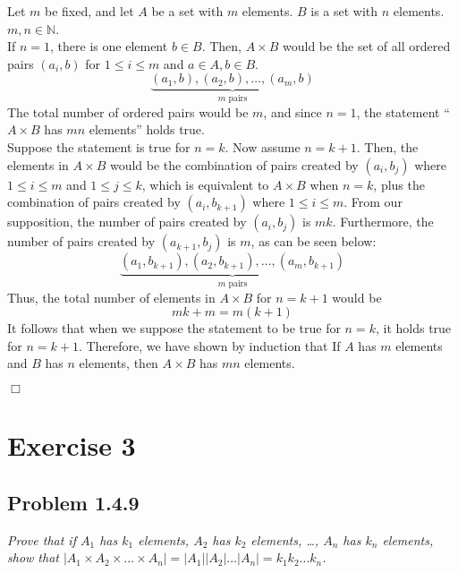 \documentclass[
]{article}
\begin{document}
Let \(m\) be fixed, and let \(A\) be a set with \(m\) elements. \(B\) is
a set with \(n\) elements. \(m, n \in \mathbb{N}\).\\
If \(n=1\), there is one element \(b \in B\). Then, \(A \times B\) would
be the set of all ordered pairs \((a_i, b)\) for \(1 \leq i \leq m\) and
\(a \in A, b \in B\).\\
\[\underbrace{(a_1, b), (a_2, b), \dots, (a_m, b)}_{m \text{ pairs}}\]
The total number of ordered pairs would be \(m\), and since \(n=1\), the
statement ``\(A \times B\) has \(mn\) elements'' holds true.\\
Suppose the statement is true for \(n = k\). Now assume \(n = k+1\).
Then, the elements in \(A \times B\) would be the combination of pairs
created by \((a_i, b_j)\) where \(1 \leq i \leq m\) and
\(1 \leq j \leq k\), which is equivalent to \(A \times B\) when
\(n = k\), plus the combination of pairs created by \((a_i, b_{k+1})\)
where \(1 \leq i \leq m\). From our supposition, the number of pairs
created by \((a_i, b_j)\) is \(mk\). Furthermore, the number of pairs
created by \((a_{k+1}, b_j)\) is \(m\), as can be seen below:\\
\[\underbrace{(a_1, b_{k+1}), (a_2, b_{k+1}), \dots, (a_m, b_{k+1})}_{m \text{ pairs}}\]
Thus, the total number of elements in \(A \times B\) for \(n=k+1\) would
be \[mk + m = m(k + 1)\] It follows that when we suppose the statement
to be true for \(n = k\), it holds true for \(n = k+1\). Therefore, we
have shown by induction that If \(A\) has \(m\) elements and \(B\) has
\(n\) elements, then \(A \times B\) has \(mn\) elements.

\hfill \(\Box\)

\hypertarget{exercise-3}{%
\section{Exercise 3}\label{exercise-3}}

\hypertarget{problem-1.4.9}{%
\subsection{Problem 1.4.9}\label{problem-1.4.9}}

\emph{Prove that if \(A_1\) has \(k_1\) elements, \(A_2\) has \(k_2\)
elements, \ldots, \(A_n\) has \(k_n\) elements, show that
\(|A_1 \times A_2 \times \dots \times A_n| = |A_1||A_2|\dots|A_n|=k_1k_2\dots k_n\).}
\end{document}
